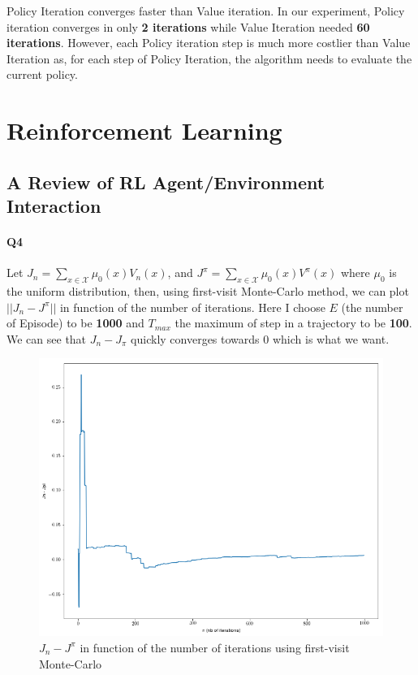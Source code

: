 \documentclass[11pt]{article}
\numberwithin{figure}{section} %
\begin{document}
Policy Iteration converges faster than Value iteration. In our experiment, Policy iteration converges in only \textbf{2 iterations} while Value Iteration needed \textbf{60 iterations}. However, each Policy iteration step is much more costlier than Value Iteration as, for each step of Policy Iteration, the algorithm needs to evaluate the current policy.

\section{Reinforcement Learning}
\subsection{A Review of RL Agent/Environment Interaction}
\paragraph{Q4} Let $J_{n} = \sum\limits_{x \in \mathcal{X}} \mu_0(x)V_n(x)$, and $J^{\pi} = \sum\limits_{x \in \mathcal{X}}\mu_0(x)V^{\pi}(x)$ where $\mu_0$ is the uniform distribution, then, using first-visit Monte-Carlo method, we can plot $||J_n - J^{\pi}||$ in function of the number of iterations. Here I choose $E$ (the number of Episode) to be \textbf{1000} and $T_{max}$ the maximum of step in a trajectory to be \textbf{100}. We can see that $J_n - J_{\pi}$ quickly converges towards 0 which is what we want.

\begin{figure}[H]
\centering
\includegraphics[width=1\linewidth]{images/MC}
\caption{$J_n - J^{\pi}$ in function of the number of iterations using first-visit Monte-Carlo}
\label{fig:MC}
\end{figure}
\end{document}
